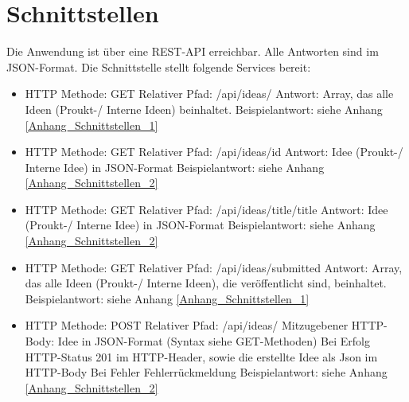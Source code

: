 \usepackage{cleveref}



\section{Schnittstellen}

Die Anwendung ist über eine REST-API erreichbar. Alle Antworten sind im JSON-Format. Die Schnittstelle stellt folgende Services bereit:
\begin{itemize}
    \item HTTP Methode: GET
    \subitem Relativer Pfad: /api/ideas/
    \subitem Antwort: Array, das alle Ideen (Proukt-/ Interne Ideen) beinhaltet.
    \subitem Beispielantwort: siehe Anhang \cref{Anhang_Schnittstellen_1}
\end{itemize}

\begin{itemize}
    \item HTTP Methode: GET
    \subitem Relativer Pfad: /api/ideas/{id}
    \subitem Antwort: Idee (Proukt-/ Interne Idee) in JSON-Format
    \subitem Beispielantwort: siehe Anhang \cref{Anhang_Schnittstellen_2}
\end{itemize}

\begin{itemize}
    \item HTTP Methode: GET
    \subitem Relativer Pfad: /api/ideas/title/{title}
    \subitem Antwort: Idee (Proukt-/ Interne Idee) in JSON-Format
    \subitem Beispielantwort: siehe Anhang \cref{Anhang_Schnittstellen_2}
\end{itemize}

\begin{itemize}
    \item HTTP Methode: GET
    \subitem Relativer Pfad: /api/ideas/submitted
    \subitem Antwort: Array, das alle Ideen (Proukt-/ Interne Ideen), die veröffentlicht sind, beinhaltet.
    \subitem Beispielantwort: siehe Anhang \cref{Anhang_Schnittstellen_1}
\end{itemize}

\begin{itemize}
    \item HTTP Methode: POST
    \subitem Relativer Pfad: /api/ideas/
    \subitem Mitzugebener HTTP-Body: Idee in JSON-Format (Syntax siehe GET-Methoden)
    \subitem Bei Erfolg
    \subsubitem HTTP-Status 201 im HTTP-Header, sowie die erstellte Idee als Json im HTTP-Body
    \subitem Bei Fehler
    \subsubitem Fehlerrückmeldung
    \subitem Beispielantwort: siehe Anhang \cref{Anhang_Schnittstellen_2}
\end{itemize}

